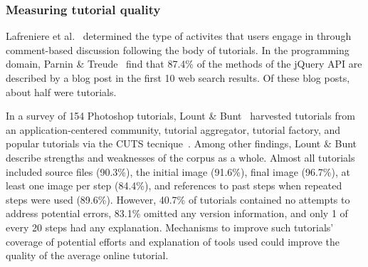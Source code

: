 \subsubsection{Measuring tutorial quality}

Lafreniere et al.~\cite{lafreniere_understanding_2013} determined the type of activites that users engage in through comment-based discussion following the body of tutorials.
In the programming domain, Parnin \& Treude~\cite{parnin_measuring_2011} find that 87.4\% of the methods of the jQuery API are described by a blog post in the first 10 web search results.
Of these blog posts, about half were tutorials.

In a survey of 154 Photoshop tutorials, Lount \& Bunt~\cite{lount_characterizing_2014} harvested tutorials from an application-centered community, tutorial aggregator, tutorial factory, and popular tutorials via the CUTS tecnique~\cite{fourney_characterizing_2011}.
Among other findings, Lount \& Bunt describe strengths and weaknesses of the corpus as a whole.
Almost all tutorials included source files (90.3\%), the initial image (91.6\%), final image (96.7\%), at least one image per step (84.4\%), and references to past steps when repeated steps were used (89.6\%).
However, 40.7\% of tutorials contained no attempts to address potential errors, 83.1\% omitted any version information, and only 1 of every 20 steps had any explanation.
Mechanisms to improve such tutorials' coverage of potential efforts and explanation of tools used could improve the quality of the average online tutorial.


